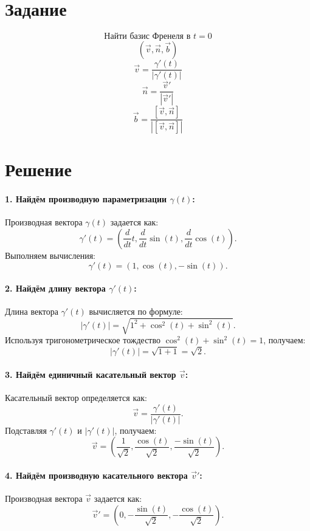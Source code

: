 \documentclass{article}
\begin{document}
        \section{Задание}
        \[
        \text{Найти базис Френеля в } t = 0
        \]
        \[
        \left( \vec{v}, \vec{n}, \vec{b} \right)
        \]
        \[
        \vec{v} = \frac{\gamma'(t)}{\left|\gamma'(t)\right|}
        \]
        \[
        \vec{n} = \frac{\vec{v}'}{\left|\vec{v}'\right|}
        \]
        \[
        \vec{b} = \frac{[\vec{v}, \vec{n}]}{\left|[\vec{v}, \vec{n}]\right|}
        \]
        \section*{Решение}
        \paragraph{1. Найдём производную параметризации \(\gamma(t)\):}
        Производная вектора \(\gamma(t)\) задается как:
        \[
        \gamma'(t) = \left( \frac{d}{dt}t, \frac{d}{dt}\sin(t), \frac{d}{dt}\cos(t) \right).
        \]
        Выполняем вычисления:
        \[
        \gamma'(t) = (1, \cos(t), -\sin(t)).
        \]
        
        \paragraph{2. Найдём длину вектора \(\gamma'(t)\):}
        Длина вектора \(\gamma'(t)\) вычисляется по формуле:
        \[
        \left|\gamma'(t)\right| = \sqrt{1^2 + \cos^2(t) + \sin^2(t)}.
        \]
        Используя тригонометрическое тождество \( \cos^2(t) + \sin^2(t) = 1 \), получаем:
        \[
        \left|\gamma'(t)\right| = \sqrt{1 + 1} = \sqrt{2}.
        \]
        
        \paragraph{3. Найдём единичный касательный вектор \(\vec{v}\):}
        Касательный вектор определяется как:
        \[
        \vec{v} = \frac{\gamma'(t)}{\left|\gamma'(t)\right|}.
        \]
        Подставляя \(\gamma'(t)\) и \(\left|\gamma'(t)\right|\), получаем:
        \[
        \vec{v} = \left(\frac{1}{\sqrt{2}}, \frac{\cos(t)}{\sqrt{2}}, \frac{-\sin(t)}{\sqrt{2}}\right).
        \]
        
        \paragraph{4. Найдём производную касательного вектора \(\vec{v}'\):}
        Производная вектора \(\vec{v}\) задается как:
        \[
        \vec{v}' = \left(0, -\frac{\sin(t)}{\sqrt{2}}, -\frac{\cos(t)}{\sqrt{2}}\right).
        \]
        
\end{document}
